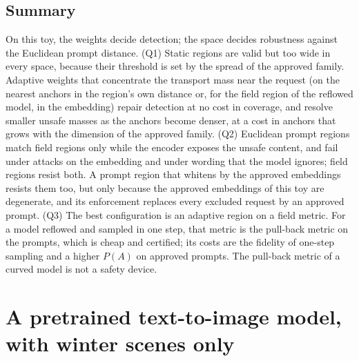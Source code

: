 \documentclass{article}
\theoremstyle{plain}
\theoremstyle{remark}
\begin{document}
\subsection{Summary}\label{sec:e2_summary}

On this toy, the weights decide detection; the space decides robustness against the Euclidean prompt distance.
(Q1) Static regions are valid but too wide in every space, because their threshold is set by the spread of the approved family.
Adaptive weights that concentrate the transport mass near the request (on the nearest anchors in the region's own distance or, for
the field region of the reflowed model, in the embedding) repair detection at no cost in coverage, and resolve smaller unsafe masses
as the anchors become denser, at a cost in anchors that grows with the dimension of the approved family.
(Q2) Euclidean prompt regions match field regions only while the encoder exposes the unsafe content, and fail under attacks on the
embedding and under wording that the model ignores; field regions resist both. A prompt region that whitens by the approved
embeddings resists them too, but only because the approved embeddings of this toy are degenerate, and its enforcement replaces
every excluded request by an approved prompt.
(Q3) The best configuration is an adaptive region on a field metric. For a model reflowed and sampled in one step, that metric is
the pull-back metric on the prompts, which is cheap and certified; its costs are the fidelity of one-step sampling and a higher
$P(A)$ on approved prompts. The pull-back metric of a curved model is not a safety device.

\section{A pretrained text-to-image model, with winter scenes only}\label{sec:e3}
\end{document}
